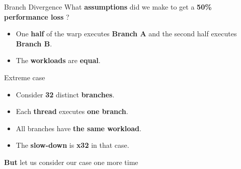 \documentclass[9pt]{beamer}
\newcommand{\emphasize}[1]{\textbf{\color{red} #1 } }
\begin{document}
\begin{frame}[t]{Branch Divergence }
What \textbf{assumptions} did we make to get a \emphasize{50\% performance loss}?
\begin{itemize}
	\item One \textbf{half} of the warp executes \textbf{Branch A} and the second half executes \\ \textbf{Branch B}.
	\item The \textbf{workloads} are \textbf{equal}.
\end{itemize}

\begin{alertblock}{Extreme case}
	\begin{itemize}
		\item Consider \textbf{32} distinct \textbf{branches}.
		\item Each \textbf{thread} executes \textbf{one branch}.
		\item All branches have \textbf{the same workload}.
		\item The \textbf{slow-down} is \textbf{x32} in that case.
	\end{itemize}
	
\end{alertblock}
\bigskip
\textbf{But} let us consider our case one more time
\end{frame}
\end{document}
